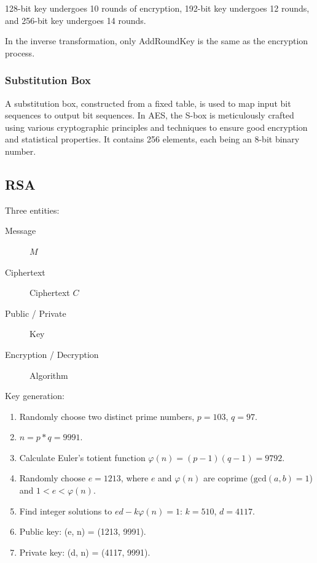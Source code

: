 \documentclass[11pt,journal,compsoc]{IEEEtran}
\begin{document}
128-bit key undergoes 10 rounds of encryption, 192-bit key undergoes 12 rounds, and 256-bit key undergoes 14 rounds.

In the inverse transformation, only AddRoundKey is the same as the encryption process.

\subsubsection{Substitution Box}

A substitution box, constructed from a fixed table, is used to map input bit sequences to output bit sequences. In AES, the S-box is meticulously crafted using various cryptographic principles and techniques to ensure good encryption and statistical properties. It contains 256 elements, each being an 8-bit binary number.

\subsection{RSA}

Three entities:

\begin{description}
    \item[Message] $M$
    
    \item[Ciphertext] Ciphertext $C$
    
    \item[Public / Private] Key
    
    \item[Encryption / Decryption] Algorithm
\end{description}

Key generation:

\begin{enumerate}
    \item Randomly choose two distinct prime numbers, $p = 103$, $q = 97$.
    
    \item $n = p * q = 9991$.
    
    \item Calculate Euler's totient function $\varphi(n) = (p - 1)(q - 1) = 9792$.
    
    \item Randomly choose $e = 1213$, where $e$ and $\varphi(n)$ are coprime ($\text{gcd}(a, b) = 1$) and $1 < e < \varphi(n)$.
    
    \item Find integer solutions to $ed - k\varphi(n) = 1$: $k = 510$, $d = 4117$.
    
    \item Public key: (e, n) = (1213, 9991).
    
    \item Private key: (d, n) = (4117, 9991).
\end{enumerate}
\end{document}
